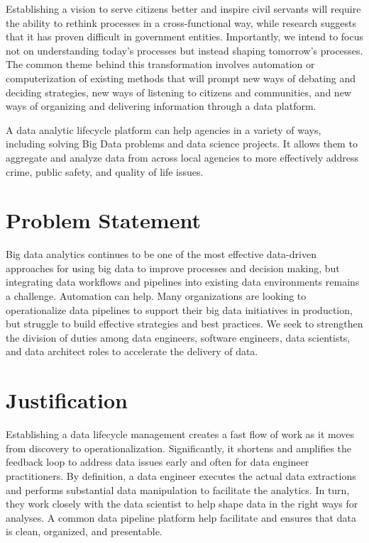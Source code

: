 \documentclass[conference]{IEEEtran}
\begin{document}
Establishing a vision to serve citizens better and inspire civil servants will require the ability to rethink processes in a cross-functional way, while research suggests that it has proven difficult in government entities\cite{Weerakkody}.  Importantly, we intend to focus not on understanding today's processes but instead shaping tomorrow's processes. The common theme behind this transformation involves automation or computerization of existing methods that will prompt new ways of debating and deciding strategies, new ways of listening to citizens and communities, and new ways of organizing and delivering information\cite{eGov} through a data platform.  

A data analytic lifecycle platform can help agencies in a variety of ways, including solving Big Data problems and data science projects. It allows them to aggregate and analyze data from across local agencies to more effectively address crime, public safety, and quality of life issues. 
%
%
\section{Problem Statement}
Big data analytics continues to be one of the most effective data-driven approaches for using big data to improve processes and decision making, but integrating data workflows and pipelines into existing data environments remains a challenge. Automation can help.  Many organizations are looking to operationalize data pipelines to support their big data initiatives in production, but struggle to build effective strategies and best practices. We seek to strengthen the division of duties among data engineers, software engineers, data scientists, and data architect roles to accelerate the delivery of data.


\section{Justification}
Establishing a data lifecycle management creates a fast flow of work as it moves from discovery to operationalization.  Significantly, it shortens and amplifies the feedback loop to address data issues early and often for data engineer practitioners.  By definition, a data engineer executes the actual data extractions and performs substantial data manipulation to facilitate the analytics.  In turn, they work closely with the data scientist to help shape data in the right ways for analyses.  A common data pipeline platform help facilitate and ensures that data is clean, organized, and presentable.
\end{document}
